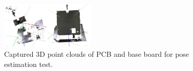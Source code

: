 \documentclass{ieeeaccess}
\begin{document}
\begin{figure}[t!]
\centering
\includegraphics[width=0.4\textwidth]{bayesian_result.png}
\caption{Captured 3D point clouds of PCB and base board for pose
estimation test.}
\end{figure}



%
%
%
%
%
%
%
%
%
%
%
\end{document}

